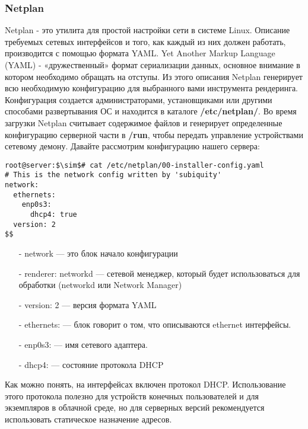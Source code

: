 \documentclass[14pt, a4paper]{article}
\begin{document}
\subsubsection*{Netplan} 

Netplan - это утилита для простой настройки сети в системе Linux. Описание требуемых сетевых
интерфейсов и того, как каждый из них должен работать, производится с помощью формата YAML. Yet
Another Markup Language (YAML) - «дружественный» формат сериализации данных, основное
внимание в котором необходимо обращать на отступы. Из этого описания Netplan генерирует всю
необходимую конфигурацию для выбранного вами инструмента рендеринга.\\

Конфигурация создается администраторами, установщиками или другими способами развертывания
ОС и находится в каталоге \textbf{/etc/netplan/}. Во время загрузки Netplan считывает содержимое файлов и
генерирует определенные конфигурацию серверной части в \textbf{/run}, чтобы передать управление
устройствами сетевому демону. Давайте рассмотрим конфигурацию нашего сервера:

\vspace{0.3cm}
\begin{lstlisting}
root@server:$\sim$# cat /etc/netplan/00-installer-config.yaml
# This is the network config written by 'subiquity'
network:
  ethernets:
    enp0s3:
      dhcp4: true
  version: 2
$$
\end{lstlisting}
\vspace{0.2cm}

\begin{itemize}
    \item[-] network — это блок начало конфигурации
    \item[-] renderer: networkd — сетевой менеджер, который будет использоваться для обработки
    (networkd или Network Manager)
    \item[-] version: 2 — версия формата YAML
    \item[-] ethernets: — блок говорит о том, что описываются ethernet интерфейсы.
    \item[-] enp0s3: — имя сетевого адаптера.
    \item[-] dhcp4: — состояние протокола DHCP
\end{itemize}

Как можно понять, на интерфейсах включен протокол DHCP. Использование этого протокола полезно
для устройств конечных пользователей и для экземпляров в облачной среде, но для серверных
версий рекомендуется использовать статическое назначение адресов.\\
\end{document}

